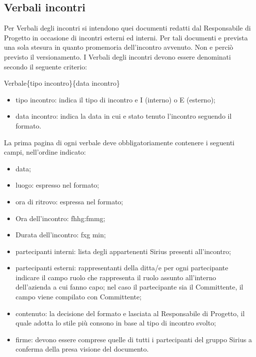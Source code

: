 \subsection{Verbali incontri}

Per Verbali degli incontri si intendono quei documenti redatti dal Responsabile di Progetto in occasione di incontri esterni ed interni.
Per tali documenti e prevista una sola stesura in quanto promemoria dell'incontro avvenuto.
Non e perciò previsto il versionamento.
I Verbali degli incontri devono essere denominati secondo il seguente criterio:

\begin{center}
Verbale\{tipo incontro\}\{data incontro\}
\end{center}

\begin{itemize}
\item tipo incontro: indica il tipo di incontro e I (interno) o E (esterno);
\item data incontro: indica la data in cui  e stato tenuto l'incontro seguendo il formato.
\end{itemize}
  
  
La prima pagina di ogni verbale deve obbligatoriamente contenere i seguenti campi, nell'ordine indicato:

\begin{itemize}
\item data;
\item luogo: espresso nel formato;
\item ora di ritrovo: espressa nel formato;
\item Ora dell'incontro: fhhg:fmmg;
\item Durata dell'incontro: fxg min;
\item partecipanti interni: lista degli appartenenti Sirius presenti all'incontro;
\item partecipanti esterni: rappresentanti della ditta/e per ogni partecipante indicare il campo ruolo che rappresenta il ruolo assunto all'interno dell'azienda a cui fanno capo; nel caso il partecipante sia il Committente, il campo viene compilato con Committente;
\item contenuto: la decisione del formato  e lasciata al Responsabile di Progetto, il quale adotta lo stile più consono in base al tipo di incontro svolto;
\item firme: devono essere comprese quelle di tutti i partecipanti del gruppo Sirius a conferma della presa visione del documento.
\end{itemize}

